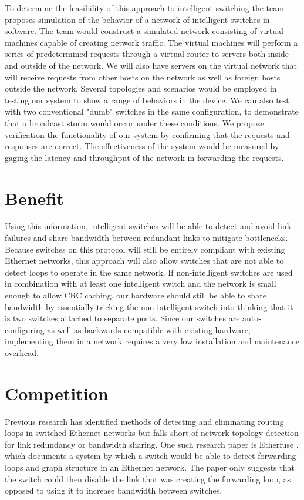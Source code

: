 \documentclass{article}
\begin{document}
	To determine the feasibility of this approach to intelligent switching the team proposes simulation of the behavior of a network of intelligent switches in software.
	The team would construct a simulated network consisting of virtual machines capable of creating network traffic.
	The virtual machines will perform a series of predetermined requests through a virtual router to servers both inside and outside of the network.
	We will also have servers on the virtual network that will receive requests from other hosts on the network as well as foreign hosts outside the network.
	Several topologies and scenarios would be employed in testing our system to show a range of behaviors in the device.
	We can also test with two conventional "dumb" switches in the same configuration, to demonstrate that a broadcast storm would occur under these conditions.
	We propose verification the functionality of our system by confirming that the requests and responses are correct.
	The effectiveness of the system would be measured by gaging the latency and throughput of the network in forwarding the requests.
\section{Benefit}
	Using this information, intelligent switches will be able to detect and avoid link failures and share bandwidth between redundant links to mitigate bottlenecks.
	Because switches on this protocol will still be entirely compliant with existing Ethernet networks, this approach will also allow switches that are not able to detect loops to operate in the same network.
	If non-intelligent switches are used in combination with at least one intelligent switch and the network is small enough to allow CRC caching, our hardware should still be able to share bandwidth by essentially tricking the non-intelligent switch into thinking that it is two switches attached to separate ports.
	Since our switches are auto-configuring as well as backwards compatible with existing hardware, implementing them in a network requires a very low installation and maintenance overhead.
\section{Competition}
	Previous research has identified methods of detecting and eliminating routing loops in switched Ethernet networks but falls short of network topology detection for link redundancy or bandwidth sharing.
	One such research paper is Etherfuse \cite{etherfuse}, which documents a system by which a switch would be able to detect forwarding loops and graph structure in an Ethernet network.
	The paper only suggests that the switch could then disable the link that was creating the forwarding loop, as opposed to using it to increase bandwidth between switches.
	


\end{document}
